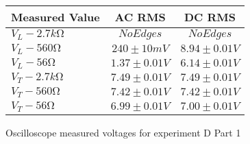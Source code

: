 \begin{figure}[H]    \centering    \begin{tabular}{|l|c|c|}
        \hline
        Measured Value & AC RMS & DC RMS \\
        \hline
        $V_{L} - 2.7\unit{k\ohm}$ & $No Edges$ & $No Edges$ \\
        $V_{L} - 560\unit{\ohm}$ & $240\pm 10\unit{mV}$ & $8.94\pm 0.01\unit{V}$ \\
        $V_{L} - 56\unit{\ohm}$ & $1.37\pm 0.01\unit{V}$ & $6.14\pm 0.01\unit{V}$ \\
        $V_{T} - 2.7\unit{k\ohm}$ & $7.49\pm 0.01\unit{V}$ & $7.49\pm 0.01\unit{V}$ \\
        $V_{T} - 560\unit{\ohm}$ & $7.42\pm 0.01\unit{V}$ & $7.42\pm 0.01\unit{V}$ \\
        $V_{T} - 56\unit{\ohm}$ & $6.99\pm 0.01\unit{V}$ & $7.00\pm 0.01\unit{V}$ \\
        \hline
    \end{tabular}    \caption{Oscilloscope measured voltages for experiment D Part 1}\end{figure}